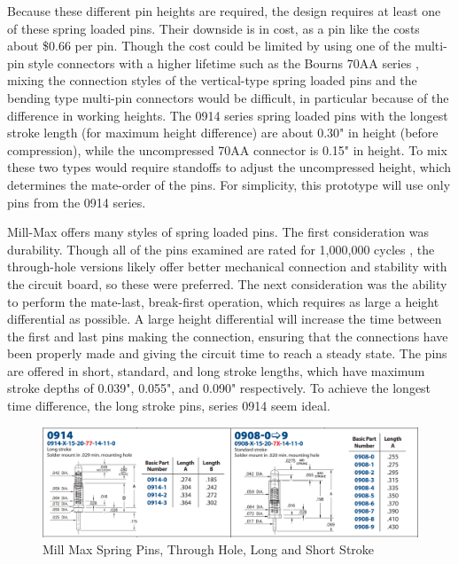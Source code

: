 \documentclass{article}
\begin{document}
		Because these different pin heights are required, the design requires at least one of these spring loaded pins.  Their downside is in cost, as a pin like the costs about \$0.66 per pin.  Though the cost could be limited by using one of the multi-pin style connectors with a higher lifetime such as the Bourns 70AA series \cite{Bourns70AA_datasheet}, mixing the connection styles of the vertical-type spring loaded pins and the bending type multi-pin connectors would be difficult, in particular because of the difference in working heights.  The 0914 series spring loaded pins with the longest stroke length (for maximum height difference) are about 0.30" in height (before compression), while the uncompressed 70AA connector is 0.15" in height.  To mix these two types would require standoffs to adjust the uncompressed height, which determines the mate-order of the pins.  For simplicity, this prototype will use only pins from the 0914 series.

		Mill-Max offers many styles of spring loaded pins.  The first consideration was durability.  Though all of the pins examined are rated for 1,000,000 cycles \cite{MillMax_023}\cite{MillMax_025}, the through-hole versions likely offer better mechanical connection and stability with the circuit board, so these were preferred.  The next consideration was the ability to perform the mate-last, break-first operation, which requires as large a height differential as possible.  A large height differential will increase the time between the first and last pins making the connection, ensuring that the connections have been properly made and giving the circuit time to reach a steady state.  The pins are offered in short, standard, and long stroke lengths, which have maximum stroke depths of 0.039", 0.055", and 0.090" respectively. To achieve the longest time difference, the long stroke pins, series 0914 seem ideal.

		\begin{figure}
			\centering
			\includegraphics[width = \textwidth]{PR2Images/MillMaxSeries0914_0908.png}
			\caption{Mill Max Spring Pins, Through Hole, Long and Short Stroke}
			\label{fig:millmax0914_0908}
		\end{figure}
\end{document}
